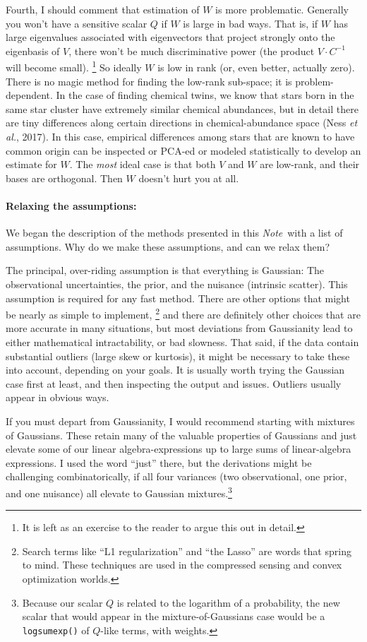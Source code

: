 \documentclass[12pt,letterpaper]{article}
\newcommand{\foreign}[1]{\textsl{#1}}
\newcommand{\acronym}[1]{{\small{#1}}}
\newcommand{\code}[1]{{\texttt{#1}}}
\newcommand{\documentname}{\textsl{Note}}
\newcommand{\etal}{\foreign{et al.}}
\newcommand{\inv}[1]{{#1}^{-1}}
\begin{document}
Fourth, I should comment that estimation of $W$ is more
problematic. Generally you won't have a sensitive scalar $Q$ if $W$ is
large in bad ways. That is, if $W$ has large eigenvalues associated
with eigenvectors that project strongly onto the eigenbasis of $V$,
there won't be much discriminative power (the product $V\cdot\inv{C}$
will become small).%
\footnote{It is left as an exercise to the reader to argue this out in detail.}
So ideally $W$ is low in rank (or, even better,
actually zero). There is no magic
method for finding the low-rank sub-space; it is problem-dependent. In
the case of finding chemical twins, we know that stars born in the
same star cluster have extremely similar chemical abundances, but in
detail there are tiny differences along certain directions in
chemical-abundance space (Ness \etal, 2017). In this case, empirical
differences among stars that are known to have common origin can be
inspected or \acronym{PCA}-ed or modeled statistically to develop an
estimate for $W$. The \emph{most} ideal case is that both $V$ and $W$
are low-rank, and their bases are orthogonal. Then $W$ doesn't hurt
you at all.

\paragraph{Relaxing the assumptions:}
We began the description of the methods presented in this
\documentname\ with a list of assumptions. Why do we make these
assumptions, and can we relax them?

The principal, over-riding assumption is that everything is Gaussian:
The observational uncertainties, the prior, and the nuisance
(intrinsic scatter). This assumption is required for any fast
method. There are other options that might be nearly as simple to implement,%
\footnote{Search terms like ``L1 regularization'' and ``the Lasso''
  are words that spring to mind. These techniques are used in the
  compressed sensing and convex optimization worlds.}
and there are
definitely other choices that are more accurate in many situations,
but most deviations from Gaussianity lead to either mathematical
intractability, or bad slowness. That said, if the data contain
substantial outliers (large skew or kurtosis), it might be necessary
to take these into account, depending on your goals. It is usually worth
trying the Gaussian case first at least, and then inspecting the
output and issues. Outliers usually appear in obvious ways.

If you must depart from Gaussianity, I would recommend starting with
mixtures of Gaussians. These retain many of the valuable properties of
Gaussians and just elevate some of our linear algebra-expressions up
to large sums of linear-algebra expressions. I used the word ``just''
there, but the derivations might be challenging combinatorically, if
all four variances (two observational, one prior, and one nuisance)
all elevate to Gaussian mixtures.\footnote{Because our scalar $Q$ is
  related to the logarithm of a probability, the new scalar that would
  appear in the mixture-of-Gaussians case would be a \code{logsumexp()}
  of $Q$-like terms, with weights.}
\end{document}
